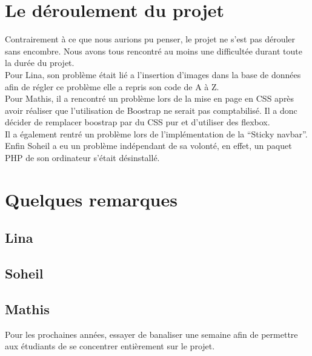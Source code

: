 \documentclass[11pt,a4paper]{article}
\begin{document}
\section{Le déroulement du projet}
Contrairement à ce que nous aurions pu penser, le projet ne s'est pas dérouler sans encombre. Nous avons tous rencontré au moins une difficultée durant toute la durée du projet.\\
Pour Lina, son problème était lié a l'insertion d'images dans la base de données afin de régler ce problème elle a repris son code de A à Z.\\
Pour Mathis, il a rencontré un problème lors de la mise en page en CSS après avoir réaliser que l'utilisation de Boostrap ne serait pas comptabilisé. Il a donc décider de remplacer boostrap par du CSS pur et d'utiliser des flexbox.\\
Il a également rentré un problème lors de l'implémentation de la ``Sticky navbar''.\\
Enfin Soheil a eu un problème indépendant de sa volonté, en effet, un paquet PHP de son ordinateur s'était désinstallé.

\section{Quelques remarques}
\subsection*{Lina}
\subsection*{Soheil}
\subsection*{Mathis}
Pour les prochaines années, essayer de banaliser une semaine afin de permettre aux étudiants de se concentrer entièrement sur le projet. 
\end{document}
